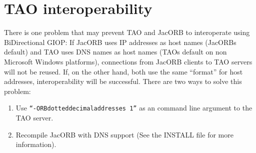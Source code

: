 \section{TAO interoperability}
There is one problem that may prevent TAO and JacORB to interoperate using
BiDirectional GIOP: If JacORB uses IP addresses as host names (JacORBs
default) and TAO uses DNS names as host names (TAOs default on non Microsoft
Windows platforms), connections from JacORB clients to TAO servers will not be
reused. If, on the other hand, both use the same ``format'' for host addresses,
interoperability will be successful. There are two ways to solve this problem:
\begin{enumerate}
\item Use {\tt ``-ORBdotteddecimaladdresses 1''} as an command line argument
  to the TAO server.
\item Recompile JacORB with DNS support (See the INSTALL file for more
  information).
\end{enumerate}


